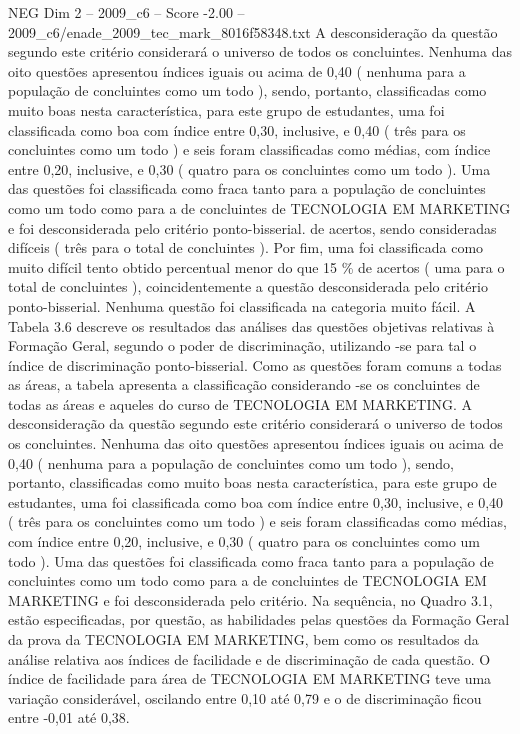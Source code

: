 \begin{textsample}{NEG Dim 2 – 2009\_c6 – Score -2.00 – 2009\_c6/enade\_2009\_tec\_mark\_8016f58348.txt}
A desconsideração da questão segundo este critério considerará o universo de todos os concluintes.
Nenhuma das oito questões apresentou índices iguais ou acima de 0,40 ( nenhuma para a população de concluintes como um todo ), sendo, portanto, classificadas como muito boas nesta característica, para este grupo de estudantes, uma foi classificada como boa com índice entre 0,30, inclusive, e 0,40 ( três para os concluintes como um todo ) e seis foram classificadas como médias, com índice entre 0,20, inclusive, e 0,30 ( quatro para os concluintes como um todo ).
Uma das questões foi classificada como fraca tanto para a população de concluintes como um todo como para a de concluintes de TECNOLOGIA EM MARKETING e foi desconsiderada pelo critério ponto-bisserial. de acertos, sendo consideradas difíceis ( três para o total de concluintes ).
Por fim, uma foi classificada como muito difícil tento obtido percentual menor do que 15 \% de acertos ( uma para o total de concluintes ), coincidentemente a questão desconsiderada pelo critério ponto-bisserial.
Nenhuma questão foi classificada na categoria muito fácil.
A Tabela 3.6 descreve os resultados das análises das questões objetivas relativas à Formação Geral, segundo o poder de discriminação, utilizando -se para tal o índice de discriminação ponto-bisserial.
Como as questões foram comuns a todas as áreas, a tabela apresenta a classificação considerando -se os concluintes de todas as áreas e aqueles do curso de TECNOLOGIA EM MARKETING.
A desconsideração da questão segundo este critério considerará o universo de todos os concluintes.
Nenhuma das oito questões apresentou índices iguais ou acima de 0,40 ( nenhuma para a população de concluintes como um todo ), sendo, portanto, classificadas como muito boas nesta característica, para este grupo de estudantes, uma foi classificada como boa com índice entre 0,30, inclusive, e 0,40 ( três para os concluintes como um todo ) e seis foram classificadas como médias, com índice entre 0,20, inclusive, e 0,30 ( quatro para os concluintes como um todo ).
Uma das questões foi classificada como fraca tanto para a população de concluintes como um todo como para a de concluintes de TECNOLOGIA EM MARKETING e foi desconsiderada pelo critério.
Na sequência, no Quadro 3.1, estão especificadas, por questão, as habilidades pelas questões da Formação Geral da prova da TECNOLOGIA EM MARKETING, bem como os resultados da análise relativa aos índices de facilidade e de discriminação de cada questão.
O índice de facilidade para área de TECNOLOGIA EM MARKETING teve uma variação considerável, oscilando entre 0,10 até 0,79 e o de discriminação ficou entre -0,01 até 0,38.

\end{textsample}
